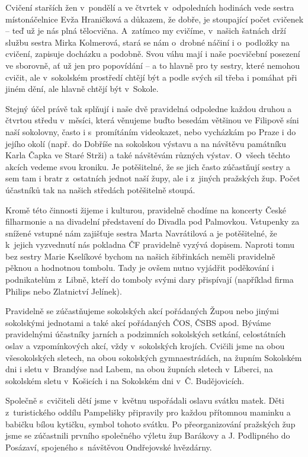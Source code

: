 \documentclass[a5paper, 12pt, twoside]{article}
\begin{document}
Cvičení starších žen v~pondělí a ve čtvrtek v~odpoledních hodinách vede
sestra místonáčelnice Evža Hraničková a důkazem, že dobře, je stoupající
počet cvičenek -- teď už je nás plná tělocvična. A~zatímco my cvičíme,
v~našich šatnách drží službu sestra Mirka Kolmerová, stará se nám o~drobné
náčiní i o~podložky na cvičení, zapisuje docházku a podobně. Svou váhu
mají i naše pocvičební posezení ve sborovně, ať už jen pro popovídání --
a to hlavně pro ty sestry, které nemohou cvičit, ale v~sokolském
prostředí chtějí být a podle svých sil třeba i pomáhat při jiném dění,
ale hlavně chtějí být v~Sokole.

Stejný účel právě tak splňují i naše dvě pravidelná odpoledne každou
druhou a čtvrtou středu v~měsíci, která věnujeme buďto besedám většinou
ve Filipově síni naší sokolovny, často i s~promítáním videokazet, nebo
vycházkám po Praze i do jejího okolí (např. do Dobříše na sokolskou
výstavu a na návštěvu památníku Karla Čapka ve Staré Strži) a také
návštěvám různých výstav. O~všech těchto akcích vedeme svou kroniku. Je
potěšitelné, že se jich často zúčastňují sestry a sem tam i bratr
z~ostatních jednot naší župy, ale i z~jiných pražských žup. Počet
účastníků tak na našich středách potěšitelně stoupá.

Kromě této činnosti žijeme i kulturou, pravidelně chodíme na koncerty
České filharmonie a na divadelní představení do Divadla pod Palmovkou.
Vstupenky za snížené vstupné nám zajišťuje sestra Marta Navrátilová a je
potěšitelné, že k~jejich vyzvednutí nás pokladna ČF pravidelně vyzývá
dopisem. Naproti tomu bez sestry Marie Kselíkové bychom na našich
šibřinkách neměli pravidelně pěknou a hodnotnou tombolu. Tady je ovšem
nutno vyjádřit poděkování i podnikatelům z~Libně, kteří do tomboly svými
dary přispívají (například firma Philips nebo Zlatnictví Jelínek).

Pravidelně se zúčastňujeme sokolských akcí pořádaných Župou nebo jinými
sokolskými jednotami a také akcí pořádaných ČOS, ČSBS apod. Býváme
pravidelnými účastníky jarních a podzimních sokolských setkání,
celostátních oslav a vzpomínkových akcí, vždy v~sokolských krojích.
Cvičili jsme na obou všesokolských sletech, na obou sokolských
gymnaestrádách, na župním Sokolském dni i sletu v~Brandýse nad Labem, na
obou župních sletech v~Liberci, na sokolském sletu v~Košicích i na
Sokolském dni v~Č. Budějovicích.

Společně s~cvičiteli dětí jsme v~květnu uspořádali oslavu svátku matek.
Děti z~turistického oddílu Pampelišky připravily pro každou přítomnou
maminku a babičku bílou kytičku, symbol tohoto svátku. Po
přeorganizování pražských žup jsme se zúčastnili prvního společného
výletu žup Barákovy a J. Podlipného do Posázaví, spojeného s~návštěvou
Ondřejovské hvězdárny.
\end{document}
